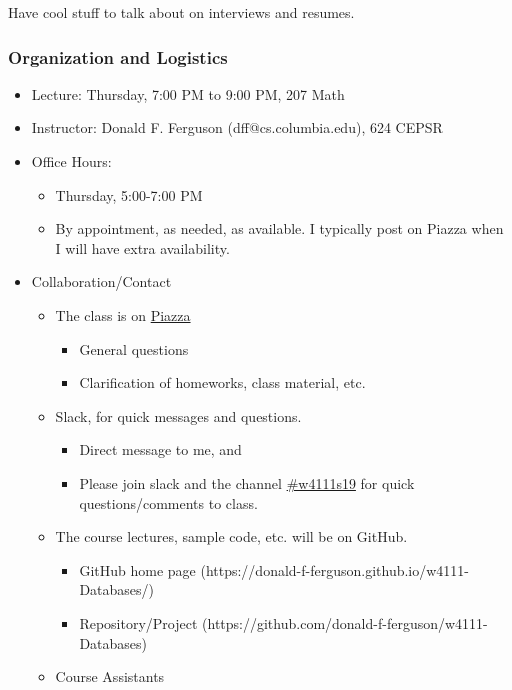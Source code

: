 \documentclass[11pt]{article}
\providecommand{\tightlist}{%
      \setlength{\itemsep}{0pt}\setlength{\parskip}{0pt}}
\begin{document}
Have cool stuff to talk about on interviews and resumes.

    \subsubsection{Organization and
Logistics}\label{organization-and-logistics}

\begin{itemize}
\item
  Lecture: Thursday, 7:00 PM to 9:00 PM, 207 Math
\item
  Instructor: Donald F. Ferguson (dff@cs.columbia.edu), 624 CEPSR
\item
  Office Hours:

  \begin{itemize}
  \tightlist
  \item
    Thursday, 5:00-7:00 PM
  \item
    By appointment, as needed, as available. I typically post on Piazza
    when I will have extra availability.
  \end{itemize}
\item
  Collaboration/Contact

  \begin{itemize}
  \tightlist
  \item
    The class is on
    \href{https://piazza.com/class/jpltphl4wz76cm}{Piazza}

    \begin{itemize}
    \tightlist
    \item
      General questions
    \item
      Clarification of homeworks, class material, etc.
    \end{itemize}
  \item
    Slack, for quick messages and questions.

    \begin{itemize}
    \tightlist
    \item
      Direct message to me, and
    \item
      Please join slack and the channel
      \href{https://join.slack.com/t/dff-columbia/shared_invite/enQtMjg0Mzk4MTQwMzQxLTZlNzk3OTZmNWE2NzNmNzViZmJlMWVmNWVlZmUxZTU5NjkwYjQ1YTdjMzA3ZTMzZDM3ZmIwYzAyYjIwYTNkZDI}{\#w4111s19}
      for quick questions/comments to class.
    \end{itemize}
  \item
    The course lectures, sample code, etc. will be on GitHub.

    \begin{itemize}
    \tightlist
    \item
      GitHub home page
      (https://donald-f-ferguson.github.io/w4111-Databases/)
    \item
      Repository/Project
      (https://github.com/donald-f-ferguson/w4111-Databases)
    \end{itemize}
  \item
    Course Assistants


\end{itemize}
\end{itemize}
\end{document}
